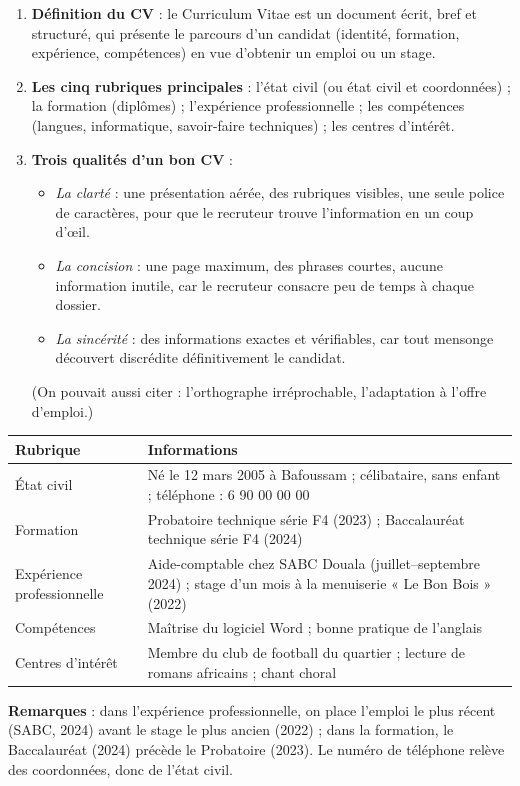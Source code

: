 \documentclass[11pt]{article}
\newcommand{\cle}[1]{{\popxbold\color{popdark}#1}}
\begin{document}
\begin{corrige}
\begin{enumerate}
\item \textbf{Définition du \cle{CV}} : le Curriculum Vitae est un document écrit, bref et structuré, qui présente le parcours d'un candidat (identité, formation, expérience, compétences) en vue d'obtenir un emploi ou un stage.
\item \textbf{Les cinq rubriques principales} : l'état civil (ou état civil et coordonnées) ; la formation (diplômes) ; l'expérience professionnelle ; les compétences (langues, informatique, savoir-faire techniques) ; les centres d'intérêt.
\item \textbf{Trois qualités d'un bon \cle{CV}} :
\begin{itemize}
\item \emph{La clarté} : une présentation aérée, des rubriques visibles, une seule police de caractères, pour que le recruteur trouve l'information en un coup d'œil.
\item \emph{La concision} : une page maximum, des phrases courtes, aucune information inutile, car le recruteur consacre peu de temps à chaque dossier.
\item \emph{La sincérité} : des informations exactes et vérifiables, car tout mensonge découvert discrédite définitivement le candidat.
\end{itemize}
(On pouvait aussi citer : l'orthographe irréprochable, l'adaptation à l'offre d'emploi.)
\end{enumerate}
\end{corrige}

\begin{corrige}
\begin{center}
\begin{tabularx}{\linewidth}{|l|X|}\hline
\rowcolor{popblueL} \textbf{Rubrique} & \textbf{Informations} \\ \hline
État civil & Né le 12 mars 2005 à Bafoussam ; célibataire, sans enfant ; téléphone : 6 90 00 00 00 \\ \hline
Formation & Probatoire technique série F4 (2023) ; Baccalauréat technique série F4 (2024) \\ \hline
Expérience professionnelle & Aide-comptable chez SABC Douala (juillet--septembre 2024) ; stage d'un mois à la menuiserie « Le Bon Bois » (2022) \\ \hline
Compétences & Maîtrise du logiciel Word ; bonne pratique de l'anglais \\ \hline
Centres d'intérêt & Membre du club de football du quartier ; lecture de romans africains ; chant choral \\ \hline
\end{tabularx}
\end{center}
\textbf{Remarques} : dans l'expérience professionnelle, on place l'emploi le plus récent (SABC, 2024) avant le stage le plus ancien (2022) ; dans la formation, le Baccalauréat (2024) précède le Probatoire (2023). Le numéro de téléphone relève des coordonnées, donc de l'état civil.
\end{corrige}
\end{document}
